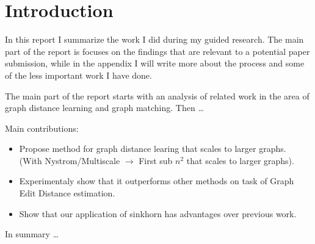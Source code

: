 \section{Introduction}

In this report I summarize the work I did during my guided research. The main part of the report is focuses on the findings that are relevant to a potential paper submission, while in the appendix I will write more about the process and some of the less important work I have done.

The main part of the report starts with an analysis of related work in the area of graph distance learning and graph matching. Then \dots

Main contributions:
\begin{itemize}
    \item Propose method for graph distance learing that scales to larger graphs. \\ (With Nystrom/Multiscale $\rightarrow$ First sub $n^2$ that scales to larger graphs).
    \item Experimentaly show that it outperforms other methods on task of Graph Edit Distance estimation.
    \item Show that our application of sinkhorn has advantages over previous work.
\end{itemize}

In summary \dots
